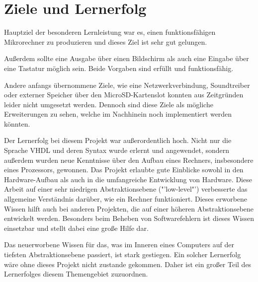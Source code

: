 \section{Ziele und Lernerfolg}
Hauptziel der besonderen Lernleistung war es, einen funktionsfähigen
Mikrorechner zu produzieren und dieses Ziel ist sehr gut gelungen.

Außerdem sollte eine Ausgabe über einen Bildschirm als auch eine Eingabe über
eine Tastatur möglich sein. Beide Vorgaben sind erfüllt und funktionsfähig.

Andere anfangs übernommene Ziele, wie eine Netzwerkverbindung, Soundtreiber oder
externer Speicher über den MicroSD-Kartenslot konnten aus Zeitgründen leider
nicht umgesetzt werden. Dennoch sind diese Ziele als mögliche Erweiterungen zu
sehen, welche im Nachhinein noch implementiert werden könnten.

Der Lernerfolg bei diesem Projekt war außerordentlich hoch. Nicht nur die
Sprache VHDL und deren Syntax wurde erlernt und angewendet, sondern außerdem
wurden neue Kenntnisse über den Aufbau eines Rechners, insbesondere eines
Prozessors, gewonnen. Das Projekt erlaubte gute Einblicke sowohl in den
Hardware-Aufbau als auch in die umfangreiche Entwicklung von Hardware. Diese
Arbeit auf einer sehr niedrigen Abstraktionsebene ("'low-level"') verbesserte das
allgemeine Verständnis darüber, wie ein Rechner funktioniert. Dieses erworbene
Wissen hilft auch bei anderen Projekten, die auf einer höheren Abstraktionsebene
entwickelt werden. Besonders beim Beheben von Softwarefehlern ist dieses Wissen
einsetzbar und stellt dabei eine große Hilfe dar.

Das neuerworbene Wissen für das, was im Inneren eines Computers auf der tiefsten
Abstraktionsebene passiert, ist stark gestiegen. Ein solcher Lernerfolg wäre
ohne dieses Projekt nicht zustande gekommen. Daher ist ein großer Teil des
Lernerfolges diesem Themengebiet zuzuordnen.

\pagebreak
